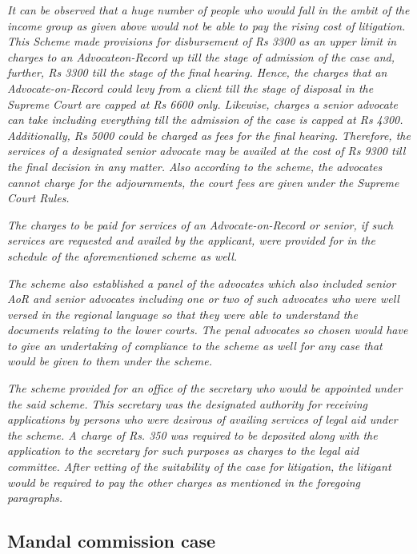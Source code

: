 \begin{multicols}{2}
\noi
\textit{It can be observed that a huge number of people who would fall in the ambit of the income group as given above would not be able to pay the rising cost of litigation. This Scheme made provisions for disbursement of Rs 3300 as an upper limit in charges to an Advocateon-Record up till the stage of admission of the case and, further, Rs 3300 till the stage of the final hearing. Hence, the charges that an Advocate-on-Record could levy from a client till the stage of disposal in the Supreme Court are capped at Rs 6600 only. Likewise, charges a senior advocate can take including everything till the admission of the case is capped at Rs 4300. Additionally, Rs 5000 could be charged as fees for the final hearing. Therefore, the services of a designated senior advocate may be availed at the cost of Rs 9300 till the final decision in any matter. Also according to the scheme, the advocates cannot charge for the adjournments, the court fees are given under the Supreme Court Rules.}

\noi
\textit{The charges to be paid for services of an Advocate-on-Record or senior, if such services are requested and availed by the applicant, were provided for in the schedule of the aforementioned scheme as well.}

\noi
\textit{The scheme also established a panel of the advocates which also included senior AoR and senior advocates including one or two of such advocates who were well versed in the regional language so that they were able to understand the documents relating to the lower courts. The penal advocates so chosen would have to give an undertaking of compliance to the scheme as well for any case that would be given to them under the scheme.}

\noi
\textit{The scheme provided for an office of the secretary who would be appointed under the said scheme. This secretary was the designated authority for receiving applications by persons who were desirous of availing services of legal aid under the scheme. A charge of Rs. 350 was required to be deposited along with the application to the secretary for such purposes as charges to the legal aid committee. After vetting of the suitability of the case for litigation, the litigant would be required to pay the other charges as mentioned in the foregoing paragraphs.}

\subsection*{Mandal commission case}


\end{multicols}
